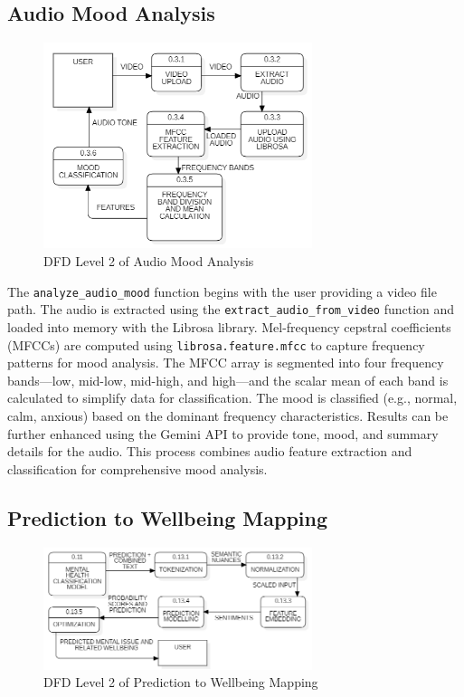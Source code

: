 \subsection{Audio Mood Analysis}

\begin{figure}[h!]  
    \centering
    \includegraphics[width=0.7\textwidth]{Images/DFD L2 AM.png}  
    \caption{DFD Level 2 of Audio Mood Analysis}
    \label{dfdl671}  %
\end{figure}

\noindent
The \texttt{analyze\_audio\_mood} function begins with the user providing a video file path. The audio is extracted using the \texttt{extract\_audio\_from\_video} function and loaded into memory with the Librosa library. Mel-frequency cepstral coefficients (MFCCs) are computed using \texttt{librosa.feature.mfcc} to capture frequency patterns for mood analysis. The MFCC array is segmented into four frequency bands—low, mid-low, mid-high, and high—and the scalar mean of each band is calculated to simplify data for classification. The mood is classified (e.g., normal, calm, anxious) based on the dominant frequency characteristics. Results can be further enhanced using the Gemini API to provide tone, mood, and summary details for the audio. This process combines audio feature extraction and classification for comprehensive mood analysis.

\subsection{Prediction to Wellbeing Mapping}

\begin{figure}[h!]  
    \centering
    \includegraphics[width=0.7\textwidth]{Images/DFD L2 MW.png}  
    \caption{DFD Level 2 of Prediction to Wellbeing Mapping}
    \label{dfdl166}  %
\end{figure}

